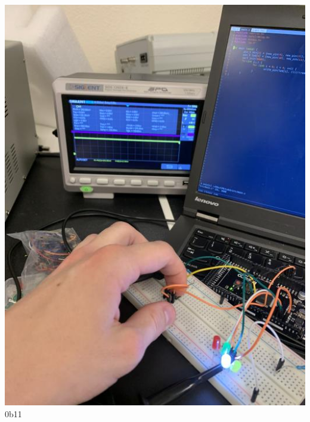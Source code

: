 \documentclass[]{article}
\begin{document}
\begin{center}
	\includegraphics[scale=.585]{2.jpg}\\
	\pagebreak
	0b11\\

\end{center}
\end{document}
